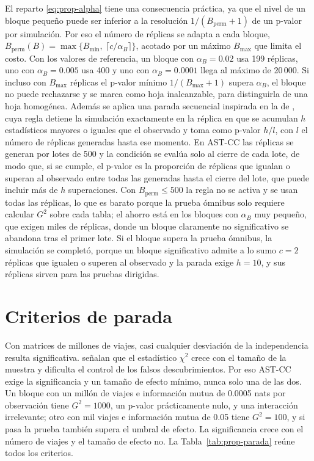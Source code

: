 El reparto \eqref{eq:prop-alpha} tiene una consecuencia práctica, ya que el nivel de un
bloque pequeño puede ser inferior a la resolución $1/(B_{\mathrm{perm}}+1)$ de
un p-valor por simulación. Por eso el número de réplicas se adapta a cada
bloque, $B_{\mathrm{perm}}(B) = \max\{B_{\min},\ \lceil c/\alpha_B\rceil\}$,
acotado por un máximo $B_{\max}$ que limita el costo. Con los valores de
referencia, un bloque con $\alpha_B=0.02$ usa 199 réplicas, uno con $\alpha_B=0.005$
usa 400 y uno con $\alpha_B=0.0001$ llega al máximo de 20\,000. Si incluso con $B_{\max}$
réplicas el p-valor mínimo $1/(B_{\max}+1)$ supera $\alpha_B$, el bloque no
puede rechazarse y se marca como hoja inalcanzable, para distinguirla de
una hoja homogénea. Además se aplica una parada secuencial inspirada en la de
\citet{Besag1991}, cuya regla detiene la simulación exactamente en la réplica en
que se acumulan $h$ estadísticos mayores o iguales que el observado y toma como
p-valor $h/l$, con $l$ el número de réplicas generadas hasta ese momento. En
AST-CC las réplicas se generan por lotes de 500 y la condición se evalúa solo al
cierre de cada lote, de modo que, si se cumple, el p-valor es la proporción de
réplicas que igualan o superan al observado entre todas las generadas hasta el
cierre del lote, que puede incluir más de $h$ superaciones. Con
$B_{\mathrm{perm}}\le 500$ la regla no se activa y se usan todas las réplicas, lo que
es barato porque la prueba ómnibus solo requiere calcular $G^2$ sobre cada tabla;
el ahorro está en los bloques con $\alpha_B$ muy pequeño, que exigen miles de
réplicas, donde un bloque claramente no significativo se abandona tras el primer
lote. Si el bloque supera la prueba ómnibus, la simulación se completó,
porque un bloque significativo admite a lo sumo $c=2$ réplicas que igualen o
superen al observado y la parada exige $h=10$, y sus réplicas sirven para las
pruebas dirigidas.

\section{Criterios de parada}\label{sec:prop-parada}

Con matrices de millones de viajes, casi cualquier desviación de la
independencia resulta significativa. \citet{Hu2025} señalan que el
estadístico $\chi^2$ crece con el tamaño de la muestra y dificulta el control de
los falsos descubrimientos. Por eso AST-CC exige la significancia y un
tamaño de efecto mínimo, nunca solo una de las dos. Un bloque con un millón de
viajes e información mutua de 0.0005 nats por observación tiene $G^2 = 1000$, un
p-valor prácticamente nulo, y una interacción irrelevante; otro con mil viajes e
información mutua de 0.05 tiene $G^2=100$, y si pasa la prueba también supera el
umbral de efecto. La significancia crece con el número de viajes y el tamaño de
efecto no. La Tabla~\ref{tab:prop-parada} reúne todos los criterios.

